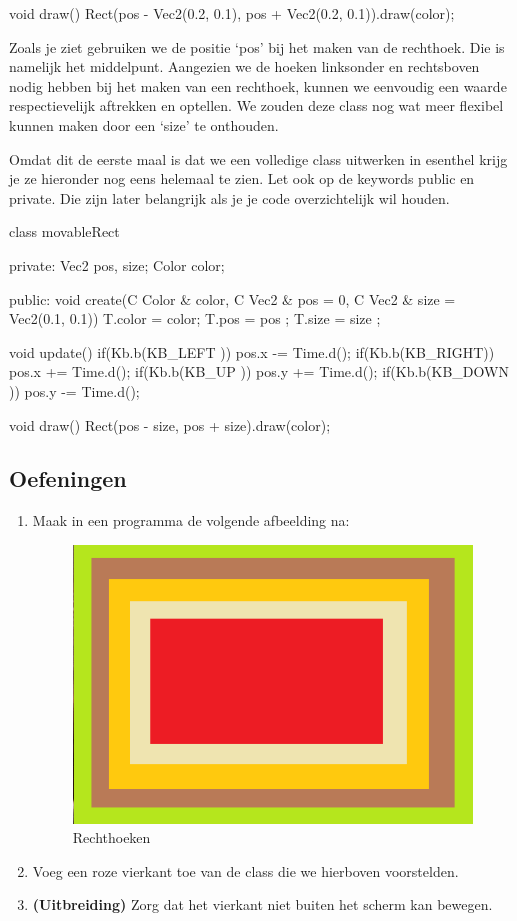 \begin{code}
void draw() {
  Rect(pos - Vec2(0.2, 0.1), pos + Vec2(0.2, 0.1)).draw(color);
}
\end{code}

Zoals je ziet gebruiken we de positie `pos' bij het maken van de rechthoek. Die is namelijk het middelpunt. Aangezien we de hoeken linksonder en rechtsboven nodig hebben bij het maken van een rechthoek, kunnen we eenvoudig een waarde respectievelijk aftrekken en optellen. We zouden deze class nog wat meer flexibel kunnen maken door een `size' te onthouden.

Omdat dit de eerste maal is dat we een volledige class uitwerken in esenthel krijg je ze hieronder nog eens helemaal te zien. Let ook op de keywords public en private. Die zijn later belangrijk als je je code overzichtelijk wil houden.

\begin{code}
class movableRect {
private:
  Vec2 pos, size;
	Color color;
	
public:
  void create(C Color & color, C Vec2 & pos = 0, C Vec2 & size = Vec2(0.1, 0.1)) {
	  T.color = color;
		T.pos   = pos  ;
		T.size  = size ;
	}
	
	void update() {
		if(Kb.b(KB_LEFT )) pos.x -= Time.d();
		if(Kb.b(KB_RIGHT)) pos.x += Time.d();
		if(Kb.b(KB_UP   )) pos.y += Time.d();
		if(Kb.b(KB_DOWN )) pos.y -= Time.d();
	}
	
	void draw() {
		Rect(pos - size, pos + size).draw(color);
	}
}
\end{code}
	
\subsection{Oefeningen}

\begin{enumerate}
\item Maak in een programma de volgende afbeelding na:

\begin{figure}[h]
\centering
\includegraphics[width=0.4\linewidth]{../images/nested_rectangles}
\caption[]{Rechthoeken}
\label{fig:nested_rect}
\end{figure}

\item Voeg een roze vierkant toe van de class  die we hierboven voorstelden.
\item \textbf{(Uitbreiding)} Zorg dat het vierkant niet buiten het scherm kan bewegen.
\end{enumerate}


